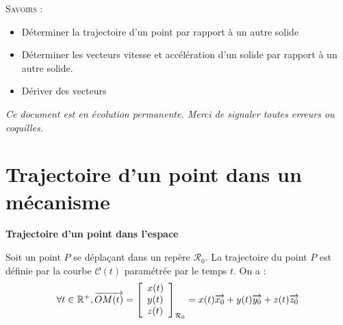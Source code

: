 \documentclass[11pt,oneside]{article}
\begin{document}
\begin{savoir}
\textsc{Savoirs :}
\begin{itemize}
\item Déterminer la trajectoire d'un point par rapport à un autre solide
\item Déterminer les vecteurs vitesse et accélération d'un solide par rapport à un autre solide.
\item Dériver des vecteurs
\end{itemize}
\end{savoir}

\setlength{\parskip}{0ex plus 0.2ex minus 0ex}
 \renewcommand{\contentsname}{}
 \renewcommand{\baselinestretch}{1}

\textit{Ce document est en évolution permanente. Merci de signaler toutes
erreurs ou coquilles.}

\tableofcontents

 \renewcommand{\baselinestretch}{1.2}
\setlength{\parskip}{2ex plus 0.5ex minus 0.2ex}





\section{Trajectoire d'un point dans un mécanisme}

\begin{defi}
\textbf{Trajectoire d'un point dans l'espace}

Soit un point $P$ se déplaçant dans un repère $\mathcal{R}_0$. La trajectoire du point $P$ est définie par la courbe $\mathcal{C}(t)$ paramétrée par le temps $t$. On a : 
$$
\forall t\in \mathbb{R}^+, \overrightarrow{OM(t)}=
\left[
\begin{array}{l}
x(t)\\
y(t)\\
z(t)\\
\end{array}
\right]_{\mathcal{R}_0}
=x(t)\overrightarrow{x_0}+y(t)\overrightarrow{y_0}+z(t)\overrightarrow{z_0}
$$
\end{defi}
\end{document}
